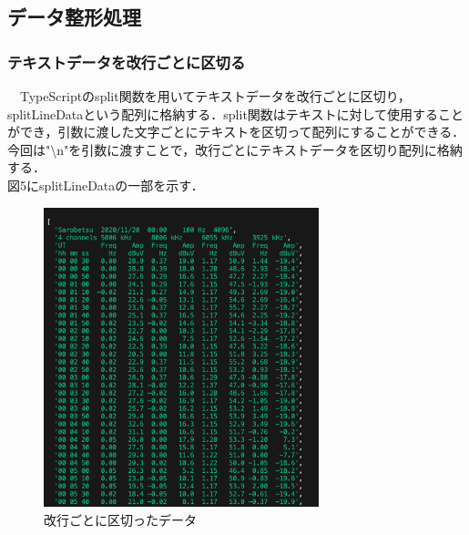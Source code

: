 \subsection{データ整形処理}
 \subsubsection{テキストデータを改行ごとに区切る}
　TypeScriptのsplit関数を用いてテキストデータを改行ごとに区切り，splitLineDataという配列に格納する．split関数はテキストに対して使用することができ，引数に渡した文字ごとにテキストを区切って配列にすることができる．今回は"\textbackslash n"を引数に渡すことで，改行ごとにテキストデータを区切り配列に格納する．\\
 図5にsplitLineDataの一部を示す．\\
 \begin{figure}[h]
   \centering
   \label{fig:my_label}
   \includegraphics[width=80mm]{fig/splitLineData.png}
    \caption{改行ごとに区切ったデータ}
 \end{figure}
 
